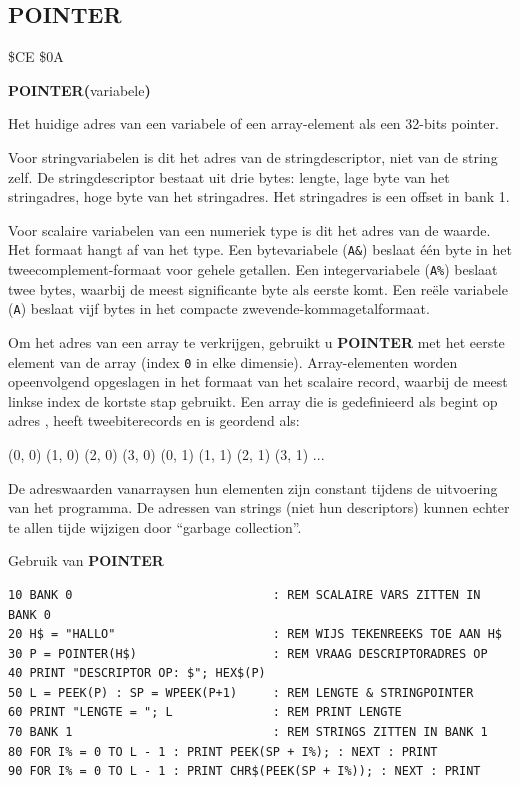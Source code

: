 \subsection{POINTER}
\begin{description}[leftmargin=2cm,style=nextline]
\item [Token:]    \$CE \$0A

\item [Formaat:]   {\bf POINTER(}variabele{\bf)}

\item [Retourneert:]  Het huidige adres van een variabele of een array-element als een 32-bits pointer.

                  Voor stringvariabelen is dit het adres van de stringdescriptor, niet van de string zelf. De stringdescriptor bestaat uit drie bytes: lengte, lage byte van het stringadres, hoge byte van het stringadres. Het stringadres is een offset in bank 1.

                  Voor scalaire variabelen van een numeriek type is dit het adres van de waarde. Het formaat hangt af van het type. Een bytevariabele ({\tt A\&}) beslaat één byte in het tweecomplement-formaat voor gehele getallen. Een integervariabele ({\tt A\%}) beslaat twee bytes, waarbij de meest significante byte als eerste komt. Een reële variabele ({\tt A}) beslaat vijf bytes in het compacte zwevende-kommagetalformaat.

                  Om het adres van een array te verkrijgen, gebruikt u {\bf POINTER} met het eerste element van de array (index {\tt 0} in elke dimensie). Array-elementen worden opeenvolgend opgeslagen in het formaat van het scalaire record, waarbij de meest linkse index de kortste stap gebruikt. Een array die is gedefinieerd als  begint op adres , heeft tweebiterecords en is geordend als:

                  (0, 0)  (1, 0)  (2, 0)  (3, 0)  (0, 1)  (1, 1)  (2, 1)  (3, 1) ...

\item [Opmerkingen:]  De adreswaarden vanarraysen hun elementen zijn constant tijdens de uitvoering van het programma. De adressen van strings (niet hun descriptors) kunnen echter te allen tijde wijzigen door ``garbage collection''.

\item [Voorbeeld:]  Gebruik van {\bf POINTER}

\begin{tcolorbox}[colback=black,coltext=white]
\verbatimfont{\codefont}
\begin{verbatim}
10 BANK 0                            : REM SCALAIRE VARS ZITTEN IN BANK 0
20 H$ = "HALLO"                      : REM WIJS TEKENREEKS TOE AAN H$
30 P = POINTER(H$)                   : REM VRAAG DESCRIPTORADRES OP
40 PRINT "DESCRIPTOR OP: $"; HEX$(P)
50 L = PEEK(P) : SP = WPEEK(P+1)     : REM LENGTE & STRINGPOINTER
60 PRINT "LENGTE = "; L              : REM PRINT LENGTE
70 BANK 1                            : REM STRINGS ZITTEN IN BANK 1
80 FOR I% = 0 TO L - 1 : PRINT PEEK(SP + I%); : NEXT : PRINT
90 FOR I% = 0 TO L - 1 : PRINT CHR$(PEEK(SP + I%)); : NEXT : PRINT


\end{verbatim}
\end{tcolorbox}
\end{description}
